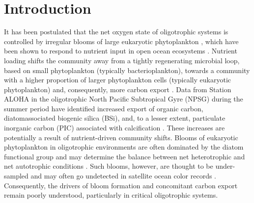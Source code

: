 \section{Introduction}
It has been postulated that the net oxygen state of oligotrophic systems is controlled by irregular blooms of large eukaryotic phytoplankton \citep{Karl2003}, which have been shown to respond to nutrient input in open ocean ecosystems \citep{McAndrew2007}. Nutrient loading shifts the community away from a tightly regenerating microbial loop, based on small phytoplankton (typically bacterioplankton), towards a community with a higher proportion of larger phytoplankton cells (typically eukaryotic phytoplankton) and, consequently, more carbon export \citep{McAndrew2007}. Data from Station ALOHA in the oligotrophic North Pacific Subtropical Gyre (NPSG) during the summer period have identified increased export of organic carbon, diatomassociated biogenic silica (BSi), and, to a lesser extent, particulate inorganic carbon (PIC) associated with calcification \citep{Karl2012}. These increases are potentially a result of nutrient-driven community shifts. Blooms of eukaryotic phytoplankton in oligotrophic environments are often dominated by the diatom functional group \citep{Villareal2012} and may determine the balance between net heterotrophic and net autotrophic conditions \citep{Karl2003}. Such blooms, however, are thought to be under-sampled and may often go undetected in satellite ocean color records \citep{Villareal2011}. Consequently, the drivers of bloom formation and concomitant carbon export remain poorly understood, particularly in critical oligotrophic systems. \par 
